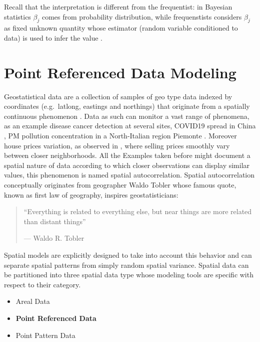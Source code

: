 \documentclass[
  12pt,
  a4paper,
  oneside]{book}
\providecommand{\tightlist}{%
  \setlength{\itemsep}{0pt}\setlength{\parskip}{0pt}}
\theoremstyle{definition}
\theoremstyle{definition}
\theoremstyle{definition}
\theoremstyle{remark}
\begin{document}
Recall that the interpretation is different from the frequentist: in Bayesian statistics \(\beta_{j}\) comes from probability distribution, while frequenstists considers \(\beta_{j}\) as fixed unknown quantity whose estimator (random variable conditioned to data) is used to infer the value \citeyearpar{Blangiardo-Cameletti}.

\hypertarget{prdm}{%
\chapter{Point Referenced Data Modeling}\label{prdm}}

Geostatistical data are a collection of samples of geo type data indexed by coordinates (e.g.~latlong, eastings and northings) that originate from a spatially continuous phenomenon \citep{Moraga2019}. Data as such can monitor a vast range of phenomena, as an example disease cancer detection \citep{Bell2006} at several sites, COVID19 spread in China \citep{Li_Li_Ding_Hu_Chen_Wang_Peng_Shen_2020}, PM pollution concentration in a North-Italian region Piemonte \citep{Cameletti2012}. Moreover house prices variation, as observed in \citet{Bayesian_INLA_Rubio}, where selling prices smoothly vary between closer neighborhoods. All the Examples taken before might document a spatial nature of data according to which closer observations can display similar values, this phenomenon is named spatial autocorrelation. Spatial autocorrelation conceptually originates from geographer Waldo Tobler whose famous quote, known as first law of geography, inspires geostatisticians:

\begin{quote}
``Everything is related to everything else,
but near things are more related than distant things''

\hfill --- Waldo R. Tobler
\end{quote}

Spatial models are explicitly designed to take into account this behavior and can separate spatial patterns from simply random spatial variance.
Spatial data can be partitioned into three spatial data type whose modeling tools are specific with respect to their category.

\begin{itemize}
\tightlist
\item
  Areal Data
\item
  \textbf{Point Referenced Data}
\item
  Point Pattern Data
\end{itemize}
\end{document}
